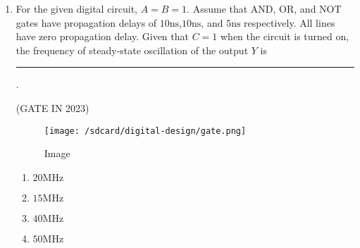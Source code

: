 \documentclass[12pt]{article}
\begin{document}
\begin{enumerate}
\item For the given digital circuit, $A = B = 1$. Assume that AND, OR, and NOT gates have propagation delays of $10\mathrm{ns}$,$10\mathrm{ns}$, and $5\mathrm{ns}$ respectively. All lines have zero
propagation delay. Given that $C = 1$ when the circuit is turned on, the frequency of steady-state oscillation of the output $Y$  is  \rule{30pt}{1pt}.

\hfill (GATE IN 2023)
\begin{figure}[!ht]
        \centering  
        
        \texttt{[image: /sdcard/digital-design/gate.png]}
        \caption{Image}
        \label{fig:Image}
        
\end{figure}
    \begin{enumerate}
        \item $20 \mathrm{MHz}$
        \item $15 \mathrm{MHz}$
        \item $40 \mathrm{MHz}$
        \item $50 \mathrm{MHz}$
    \end{enumerate}
  \end{enumerate}
\end{document}
